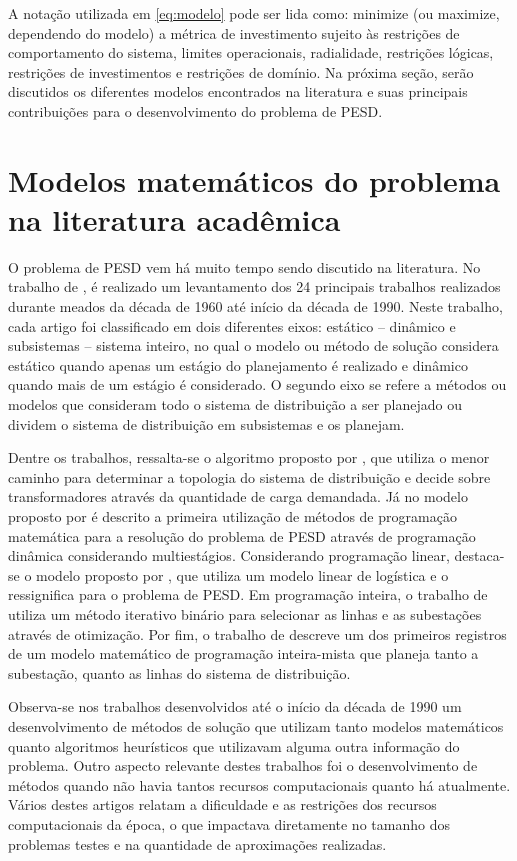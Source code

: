 A notação utilizada em \eqref{eq:modelo} pode ser lida como: minimize (ou maximize, dependendo do modelo) a métrica de investimento sujeito às restrições de comportamento do sistema, limites operacionais, radialidade, restrições lógicas, restrições de investimentos e restrições de domínio. Na próxima seção, serão discutidos os diferentes modelos encontrados na literatura e suas principais contribuições para o desenvolvimento do problema de \ac{PESD}.
\vfill

\section{Modelos matemáticos do problema na literatura acadêmica}

O problema de \ac{PESD} vem há muito tempo sendo discutido na literatura. No trabalho de , é realizado um levantamento dos 24 principais trabalhos realizados durante meados da década de 1960 até início da década de 1990. Neste trabalho, cada artigo foi classificado em dois diferentes eixos: estático -- dinâmico e subsistemas -- sistema inteiro, no qual o modelo ou método de solução considera estático quando apenas um estágio do planejamento é realizado e dinâmico quando mais de um estágio é considerado. O segundo eixo se refere a métodos ou modelos que consideram todo o sistema de distribuição a ser planejado ou dividem o sistema de distribuição em subsistemas e os planejam.


Dentre os trabalhos, ressalta-se o algoritmo proposto por , que utiliza o menor caminho para determinar a topologia do sistema de distribuição e decide sobre transformadores através da quantidade de carga demandada. Já no modelo proposto por  é descrito a primeira utilização de métodos de programação matemática para a resolução do problema de \ac{PESD} através de programação dinâmica considerando multiestágios.  Considerando programação linear, destaca-se o modelo proposto por , que utiliza um modelo linear de logística e o ressignifica para o problema de \ac{PESD}. Em programação inteira, o trabalho de  utiliza um método iterativo binário para selecionar as linhas e as subestações através de otimização. Por fim, o trabalho de  descreve um dos primeiros registros de um modelo matemático de programação inteira-mista que planeja tanto a subestação, quanto as linhas do sistema de distribuição.


Observa-se nos trabalhos desenvolvidos até o início da década de 1990 um desenvolvimento de métodos de solução que utilizam tanto modelos matemáticos quanto algoritmos heurísticos que utilizavam alguma outra informação do problema. Outro aspecto relevante destes trabalhos foi o desenvolvimento de métodos quando não havia tantos recursos computacionais quanto há atualmente. Vários destes artigos relatam a dificuldade e as restrições dos recursos computacionais da época, o que impactava diretamente no tamanho dos problemas testes e na quantidade de aproximações realizadas.


